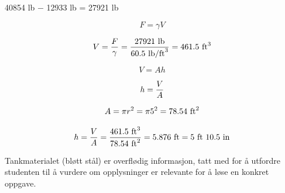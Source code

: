 40854 lb $-$ 12933 lb = 27921 lb

$$F = \gamma V$$

$$V = {F \over \gamma} = {27921 \hbox{ lb} \over 60.5 \hbox{ lb/ft}^3} = 461.5 \hbox{ ft}^3$$

$$V = Ah$$

$$h = {V \over A}$$

$$A = \pi r^2 = \pi 5^2 = 78.54 \hbox{ ft}^2$$

$$h = {V \over A} = {461.5 \hbox{ ft}^3 \over 78.54 \hbox{ ft}^2} = 5.876 \hbox{ ft} = 5 \hbox{ ft } 10.5 \hbox{ in}$$

\vskip 10pt

Tankmaterialet (bløtt stål) er overflødig informasjon, tatt med for å utfordre studenten til å vurdere om opplysninger er relevante for å løse en konkret oppgave.


